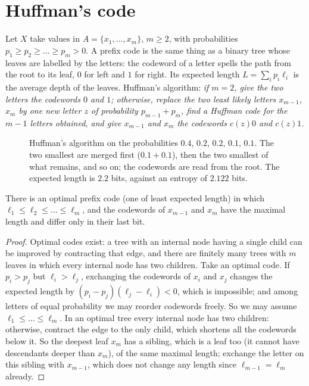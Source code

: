 \section{Huffman's code}\label{sec:huffman}

Let $X$ take values in $A=\{x_1,\dots,x_m\}$, $m\ge2$, with probabilities $p_1\ge p_2\ge\dots\ge p_m>0$. A prefix code is the same thing as a binary tree whose leaves are labelled by the letters: the codeword of a letter spells the path from the root to its leaf, $0$ for left and $1$ for right. Its expected length $L=\sum_ip_i\ell_i$ is the average depth of the leaves. Huffman's algorithm: \emph{if $m=2$, give the two letters the codewords $0$ and $1$; otherwise, replace the two least likely letters $x_{m-1}$, $x_m$ by one new letter $z$ of probability $p_{m-1}+p_m$, find a Huffman code for the $m-1$ letters obtained, and give $x_{m-1}$ and $x_m$ the codewords $c(z)0$ and $c(z)1$.}

\begin{figure}[ht]
\centering
{}
\caption{Huffman's algorithm on the probabilities $0.4$, $0.2$, $0.2$, $0.1$, $0.1$. The two smallest are merged first ($0.1+0.1$), then the two smallest of what remains, and so on; the codewords are read from the root. The expected length is $2.2$ bits, against an entropy of $2.122$ bits.}
\label{fig:huffman}
\end{figure}

\begin{lemma}\label{lem:huffswap}
There is an optimal prefix code (one of least expected length) in which $\ell_1\le\ell_2\le\dots\le\ell_m$, and the codewords of $x_{m-1}$ and $x_m$ have the maximal length and differ only in their last bit.
\end{lemma}

\begin{proof}
Optimal codes exist: a tree with an internal node having a single child can be improved by contracting that edge, and there are finitely many trees with $m$ leaves in which every internal node has two children. Take an optimal code. If $p_i>p_j$ but $\ell_i>\ell_j$, exchanging the codewords of $x_i$ and $x_j$ changes the expected length by $(p_i-p_j)(\ell_j-\ell_i)<0$, which is impossible; and among letters of equal probability we may reorder codewords freely. So we may assume $\ell_1\le\dots\le\ell_m$. In an optimal tree every internal node has two children: otherwise, contract the edge to the only child, which shortens all the codewords below it. So the deepest leaf $x_m$ has a sibling, which is a leaf too (it cannot have descendants deeper than $x_m$), of the same maximal length; exchange the letter on this sibling with $x_{m-1}$, which does not change any length since $\ell_{m-1}=\ell_m$ already.
\end{proof}

